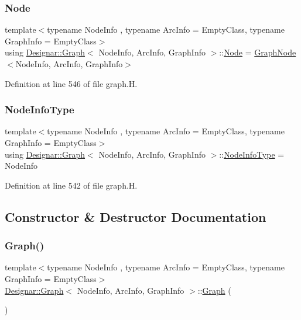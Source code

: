 \subsubsection{\texorpdfstring{Node}{Node}}
{\footnotesize\ttfamily template$<$typename Node\+Info , typename Arc\+Info  = Empty\+Class, typename Graph\+Info  = Empty\+Class$>$ \\
using \hyperlink{class_designar_1_1_graph}{Designar\+::\+Graph}$<$ Node\+Info, Arc\+Info, Graph\+Info $>$\+::\hyperlink{class_designar_1_1_graph_a5dfc7dba9d092ac489c72e40390c37d0}{Node} =  \hyperlink{class_designar_1_1_graph_node}{Graph\+Node}$<$Node\+Info, Arc\+Info, Graph\+Info$>$}



Definition at line 546 of file graph.\+H.

\mbox{\label{class_designar_1_1_graph_a31ac58ee9562d1695e63449318577032}} 
\subsubsection{\texorpdfstring{Node\+Info\+Type}{NodeInfoType}}
{\footnotesize\ttfamily template$<$typename Node\+Info , typename Arc\+Info  = Empty\+Class, typename Graph\+Info  = Empty\+Class$>$ \\
using \hyperlink{class_designar_1_1_graph}{Designar\+::\+Graph}$<$ Node\+Info, Arc\+Info, Graph\+Info $>$\+::\hyperlink{class_designar_1_1_graph_a31ac58ee9562d1695e63449318577032}{Node\+Info\+Type} =  Node\+Info}



Definition at line 542 of file graph.\+H.



\subsection{Constructor \& Destructor Documentation}
\mbox{\label{class_designar_1_1_graph_a606f7514b8036679207da8a09ddfa6bd}} 
\subsubsection{\texorpdfstring{Graph()}{Graph()}\hspace{0.1cm}{\footnotesize\ttfamily [1/5]}}
{\footnotesize\ttfamily template$<$typename Node\+Info , typename Arc\+Info  = Empty\+Class, typename Graph\+Info  = Empty\+Class$>$ \\
\hyperlink{class_designar_1_1_graph}{Designar\+::\+Graph}$<$ Node\+Info, Arc\+Info, Graph\+Info $>$\+::\hyperlink{class_designar_1_1_graph}{Graph} (\begin{DoxyParamCaption}{ }\end{DoxyParamCaption})\hspace{0.3cm}{\ttfamily [inline]}}



